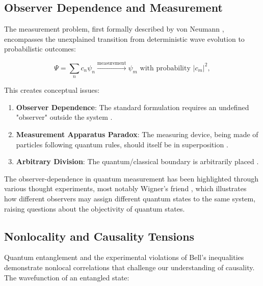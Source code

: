 \documentclass[12pt,a4paper]{article}
\begin{document}
	\subsection{Observer Dependence and Measurement}
	\label{subsec:observer_dependence}
	
	The measurement problem, first formally described by von Neumann \cite{vonNeumann1932}, encompasses the unexplained transition from deterministic wave evolution to probabilistic outcomes:
	
	\begin{equation}
		\Psi = \sum_n c_n \psi_n \xrightarrow{\text{measurement}} \psi_m \text{ with probability } |c_m|^2,
		\label{eq:collapse}
	\end{equation}
	
	This creates conceptual issues:
	
	\begin{enumerate}
		\item \textbf{Observer Dependence}: The standard formulation requires an undefined "observer" outside the system \cite{Wheeler1983, Wigner1967}.
		
		\item \textbf{Measurement Apparatus Paradox}: The measuring device, being made of particles following quantum rules, should itself be in superposition \cite{vonNeumann1932, Wigner1963}.
		
		\item \textbf{Arbitrary Division}: The quantum/classical boundary is arbitrarily placed \cite{deBroglie1930, Bohm1952, Bell1987}.
	\end{enumerate}
	
	The observer-dependence in quantum measurement has been highlighted through various thought experiments, most notably Wigner's friend \cite{Wigner1967}, which illustrates how different observers may assign different quantum states to the same system, raising questions about the objectivity of quantum states.
	
	\subsection{Nonlocality and Causality Tensions}
	\label{subsec:nonlocality}
	
	Quantum entanglement and the experimental violations of Bell's inequalities \cite{Bell1964, Aspect1982, Hensen2015} demonstrate nonlocal correlations that challenge our understanding of causality. The wavefunction of an entangled state:
	
\end{document}
